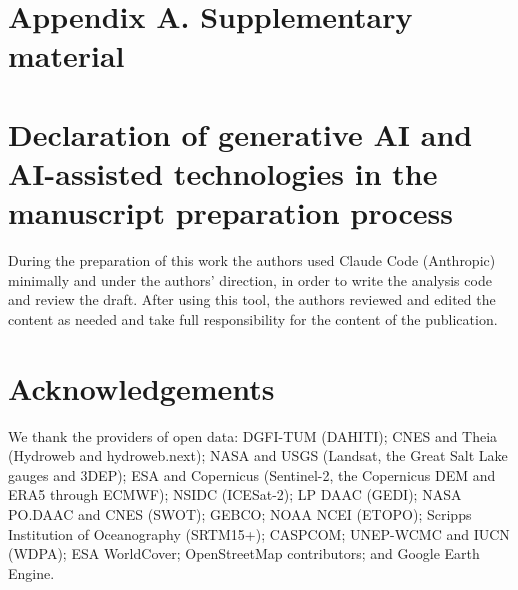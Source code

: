 \section*{Appendix A. Supplementary material}

\section*{Declaration of generative AI and AI-assisted technologies in the manuscript preparation process}
During the preparation of this work the authors used Claude Code (Anthropic) minimally and under the authors' direction, in order to write the analysis code and review the draft. After using this tool, the authors reviewed and edited the content as needed and take full responsibility for the content of the publication.

\section*{Acknowledgements}
We thank the providers of open data: DGFI-TUM (DAHITI); CNES and Theia (Hydroweb and hydroweb.next); NASA and USGS (Landsat, the Great Salt Lake gauges and 3DEP); ESA and Copernicus (Sentinel-2, the Copernicus DEM and ERA5 through ECMWF); NSIDC (ICESat-2); LP DAAC (GEDI); NASA PO.DAAC and CNES (SWOT); GEBCO; NOAA NCEI (ETOPO); Scripps Institution of Oceanography (SRTM15+); CASPCOM; UNEP-WCMC and IUCN (WDPA); ESA WorldCover; OpenStreetMap contributors; and Google Earth Engine. 
